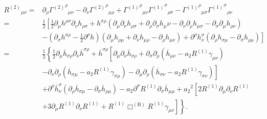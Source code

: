 \documentclass[a4paper, 11pt, titlepage, twoside]{report}
\newcommand{\recip}[1]{\ensuremath{\frac{1}{#1}}}
\begin{document}
\begin{align}
{R^{(2)}}_{\mu\nu} = {} & \partial_\rho {{\Gamma^{(2)}}^\rho}_{\mu\nu} - \partial_\nu {{\Gamma^{(2)}}^\rho}_{\mu\rho} + {{\Gamma^{(1)}}^\rho}_{\mu\nu}{{\Gamma^{(1)}}^\sigma}_{\rho\sigma} - {{\Gamma^{(1)}}^\rho}_{\mu\sigma}{{\Gamma^{(1)}}^\sigma}_{\rho\nu} \nonumber \\
 = {} & \frac{1}{2}\left[\frac{1}{2}\partial_\mu h^{\rho\sigma}\partial_\nu h_{\rho\sigma} + h^{\sigma\rho}\left(\partial_\mu\partial_\nu h_{\rho\sigma} + \partial_\rho\partial_\sigma h_\mu\nu - \partial_\nu\partial_\rho h_{\mu\sigma} - \partial_\sigma\partial_\mu h_{\rho\nu}\right) \right. \nonumber \\
 & - \left. \left(\partial_\sigma h^{\sigma\rho} - \frac{1}{2}\partial^\rho h\right)\left(\partial_\mu h_{\rho\mu} + \partial_\nu h_{\mu\rho} - \partial_\rho h_{\mu\nu}\right) + \partial^\rho h^\sigma_\nu\left(\partial_\rho h_{\sigma\mu} - \partial_\sigma h_{\rho\mu}\right) \right] \nonumber \\
 = {} & \frac{1}{2}\left\{\recip{2}\partial_\mu\overline{h}_{\sigma\rho}\partial_\nu\overline{h}^{\sigma\rho} + \overline{h}^{\sigma\rho}\left[\partial_\mu\partial_\nu\overline{h}_{\sigma\rho} + \partial_\sigma\partial_\rho\left(\overline{h}_{\mu\nu} - a_2 R^{(1)}\gamma_{\mu\nu}\right) \right.\right. \nonumber \\
 & - \left.\left. \partial_\nu\partial_\rho\left(\overline{h}_{\sigma\mu} - a_2 R^{(1)} \gamma_{\sigma\mu}\right) - \partial_\mu\partial_\rho\left(\overline{h}_{\sigma\nu} - a_2 R^{(1)} \gamma_{\sigma\nu}\right)\right] \right. \nonumber \\
 & + \left. \partial^\rho\overline{h}^\sigma_\nu\left(\partial_\rho\overline{h}_{\sigma\mu} - \partial_\sigma\overline{h}_{\rho\mu}\right) - a_2 \partial^\sigma R^{(1)}\partial_\sigma\overline{h}_{\mu\mu} + {a_2}^2 \left[2R^{(1)}\partial_\mu\partial_\nu R^{(1)} \right.\right. \nonumber \\
 & + \left.\left. 3\partial_\mu R^{(1)}\partial_\nu R^{(1)} + R^{(1)} \Box^{(\mathrm{B})} R^{(1)} \gamma_{\mu\nu}\right]\right\}.
\end{align}
\end{document}
